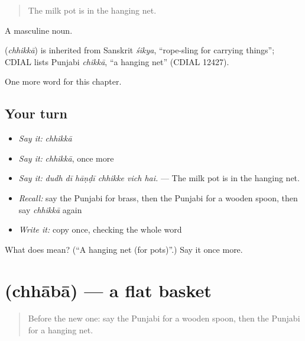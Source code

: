 \begin{quote}
The milk pot is in the hanging net.
\end{quote}

A masculine noun.

\begin{cousinweb}
\textbf{} (\emph{chhikkā}) is inherited from Sanskrit \emph{śikya}, \textquotedblleft{}rope-sling for carrying things\textquotedblright{}; CDIAL lists Punjabi \emph{chikkā}, \textquotedblleft{}a hanging net\textquotedblright{} (CDIAL 12427).
\end{cousinweb}

\begin{grammarlens}[title={What you've built}]
One more word for this chapter.
\end{grammarlens}

\subsection*{Your turn}
\begin{itemize}
\raggedright
  \item \emph{Say it:} \emph{chhikkā}
  \item \emph{Say it:} \emph{chhikkā}, once more
  \item \emph{Say it:} \emph{dudh dī hāṇḍī chhikke vich hai.} — The milk pot is in the hanging net.
  \item \emph{Recall:} say the Punjabi for brass, then the Punjabi for a wooden spoon, then say \emph{chhikkā} again
  \item \emph{Write it:} copy \textbf{} once, checking the whole word
\end{itemize}

\begin{tcolorbox}[breakable,colback=teal!4,colframe=teal!35!black,title={Before you move on}]
What does  mean? (\textquotedblleft{}A hanging net (for pots)\textquotedblright{}.) Say it once more.
\end{tcolorbox}
\section[\texorpdfstring{\pa{ਛਾਬਾ} (chhābā)}{ਛਾਬਾ (chhābā)}]{ (chhābā) — a flat basket}

\label{lesson:PA-C251-chhaba}



\begin{quote}
Before the new one: say the Punjabi for a wooden spoon, then the Punjabi for a hanging net.
\end{quote}

